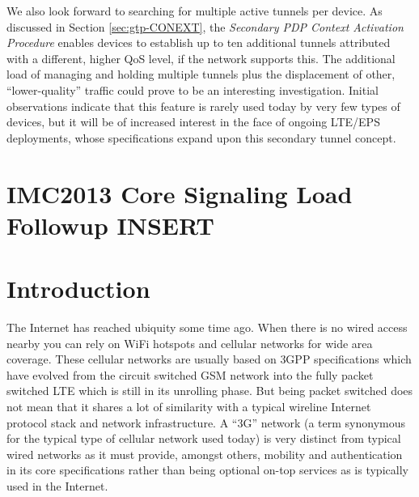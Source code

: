 We also look forward to searching for multiple active tunnels per device. As discussed in Section \ref{sec:gtp-CONEXT}, the \textit{Secondary PDP Context Activation Procedure} enables devices to establish up to ten additional tunnels attributed with a different, higher QoS level, if the network supports this. The additional load of managing and holding multiple tunnels plus the displacement of other, ``lower-quality'' traffic could prove to be an interesting investigation. Initial observations indicate that this feature is rarely used today by very few types of devices, but it will be of increased interest in the face of ongoing LTE/EPS deployments, whose specifications expand upon this secondary tunnel concept.



\section{IMC2013 Core Signaling Load Followup INSERT}

\section{Introduction}
\label{sec:introduction-IMC}


The Internet has reached ubiquity some time ago. When there is no wired access nearby you can rely on WiFi hotspots and cellular networks for wide area coverage. These cellular networks are usually based on \ac{3GPP} specifications which have evolved from the circuit switched \ac{GSM} network into the fully packet switched \ac{LTE} which is still in its unrolling phase. But being packet switched does not mean that it shares a lot of similarity with a typical wireline Internet protocol stack and network infrastructure. A ``3G'' network (a term synonymous for the typical type of cellular network used today) is very distinct from typical wired networks as it must provide, amongst others, mobility and authentication in its core specifications rather than being optional on-top services as is typically used in the Internet.

